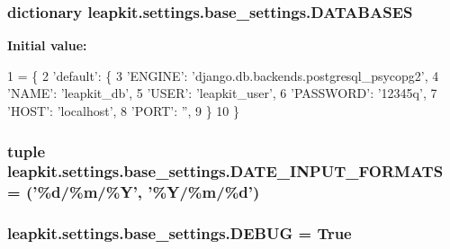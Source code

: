\hypertarget{namespaceleapkit_1_1settings_1_1base__settings_a4e28db2fe65412500c55deba3d3dc524}{
\subsubsection[{D\-A\-T\-A\-B\-A\-S\-E\-S}]{\setlength{\rightskip}{0pt plus 5cm}dictionary leapkit.\-settings.\-base\-\_\-settings.\-D\-A\-T\-A\-B\-A\-S\-E\-S}}\label{namespaceleapkit_1_1settings_1_1base__settings_a4e28db2fe65412500c55deba3d3dc524}
{\bfseries Initial value\-:}
\begin{DoxyCode}
1 = \{
2     \textcolor{stringliteral}{'default'}: \{
3         \textcolor{stringliteral}{'ENGINE'}: \textcolor{stringliteral}{'django.db.backends.postgresql\_psycopg2'},
4         \textcolor{stringliteral}{'NAME'}: \textcolor{stringliteral}{'leapkit\_db'},
5         \textcolor{stringliteral}{'USER'}: \textcolor{stringliteral}{'leapkit\_user'},
6         \textcolor{stringliteral}{'PASSWORD'}: \textcolor{stringliteral}{'12345q'},
7         \textcolor{stringliteral}{'HOST'}: \textcolor{stringliteral}{'localhost'},
8         \textcolor{stringliteral}{'PORT'}: \textcolor{stringliteral}{''},
9     \}
10 \}
\end{DoxyCode}
\hypertarget{namespaceleapkit_1_1settings_1_1base__settings_aa9eafe5867c13d54ed7b6b20c501e0a1}{
\subsubsection[{D\-A\-T\-E\-\_\-\-I\-N\-P\-U\-T\-\_\-\-F\-O\-R\-M\-A\-T\-S}]{\setlength{\rightskip}{0pt plus 5cm}tuple leapkit.\-settings.\-base\-\_\-settings.\-D\-A\-T\-E\-\_\-\-I\-N\-P\-U\-T\-\_\-\-F\-O\-R\-M\-A\-T\-S = ('\%{\bf d}/\%{\bf m}/\%Y', '\%Y/\%{\bf m}/\%{\bf d}')}}\label{namespaceleapkit_1_1settings_1_1base__settings_aa9eafe5867c13d54ed7b6b20c501e0a1}
\hypertarget{namespaceleapkit_1_1settings_1_1base__settings_a45b59b8d0ca3a36509b2ccbba0d7d452}{
\subsubsection[{D\-E\-B\-U\-G}]{\setlength{\rightskip}{0pt plus 5cm}leapkit.\-settings.\-base\-\_\-settings.\-D\-E\-B\-U\-G = True}}\label{namespaceleapkit_1_1settings_1_1base__settings_a45b59b8d0ca3a36509b2ccbba0d7d452}
